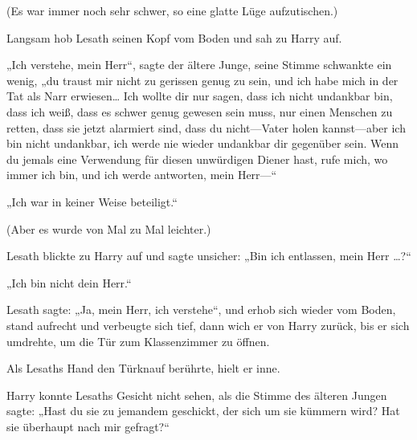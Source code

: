 (Es war immer noch sehr schwer, so eine glatte Lüge aufzutischen.)

Langsam hob Lesath seinen Kopf vom Boden und sah zu Harry auf.

„Ich verstehe, mein Herr“, sagte der ältere Junge, seine Stimme schwankte ein wenig, „du traust mir nicht zu gerissen genug zu sein, und ich habe mich in der Tat als Narr erwiesen… Ich wollte dir nur sagen, dass ich nicht undankbar bin, dass ich weiß, dass es schwer genug gewesen sein muss, nur einen Menschen zu retten, dass sie jetzt alarmiert sind, dass du nicht—Vater holen kannst—aber ich bin nicht undankbar, ich werde nie wieder undankbar dir gegenüber sein. Wenn du jemals eine Verwendung für diesen unwürdigen Diener hast, rufe mich, wo immer ich bin, und ich werde antworten, mein Herr—“

„Ich war in keiner Weise beteiligt.“

(Aber es wurde von Mal zu Mal leichter.)

Lesath blickte zu Harry auf und sagte unsicher: „Bin ich entlassen, mein Herr …?“

„Ich bin nicht dein Herr.“

Lesath sagte: „Ja, mein Herr, ich verstehe“, und erhob sich wieder vom Boden, stand aufrecht und verbeugte sich tief, dann wich er von Harry zurück, bis er sich umdrehte, um die Tür zum Klassenzimmer zu öffnen.

Als Lesaths Hand den Türknauf berührte, hielt er inne.

Harry konnte Lesaths Gesicht nicht sehen, als die Stimme des älteren Jungen sagte: „Hast du sie zu jemandem geschickt, der sich um sie kümmern wird? Hat sie überhaupt nach mir gefragt?“

